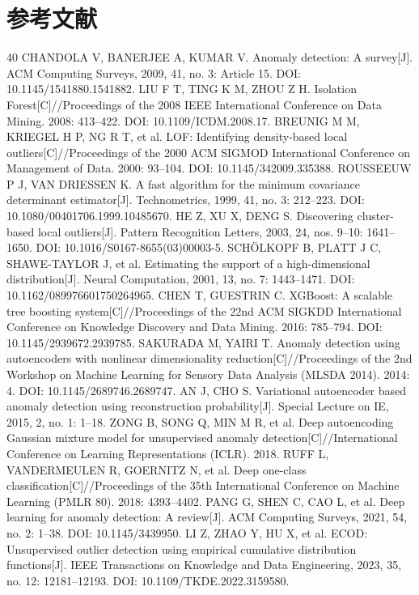 \documentclass[twocolumn,11pt]{ctexart}
\begin{document}
\section*{参考文献}
\begin{thebibliography}{40}
 CHANDOLA V, BANERJEE A, KUMAR V. Anomaly detection: A survey[J]. ACM Computing Surveys, 2009, 41, no. 3: Article 15. DOI: 10.1145/1541880.1541882.
 LIU F T, TING K M, ZHOU Z H. Isolation Forest[C]//Proceedings of the 2008 IEEE International Conference on Data Mining. 2008: 413–422. DOI: 10.1109/ICDM.2008.17.
 BREUNIG M M, KRIEGEL H P, NG R T, et al. LOF: Identifying density-based local outliers[C]//Proceedings of the 2000 ACM SIGMOD International Conference on Management of Data. 2000: 93–104. DOI: 10.1145/342009.335388.
 ROUSSEEUW P J, VAN DRIESSEN K. A fast algorithm for the minimum covariance determinant estimator[J]. Technometrics, 1999, 41, no. 3: 212–223. DOI: 10.1080/00401706.1999.10485670.
 HE Z, XU X, DENG S. Discovering cluster-based local outliers[J]. Pattern Recognition Letters, 2003, 24, nos. 9–10: 1641–1650. DOI: 10.1016/S0167-8655(03)00003-5.
 SCHÖLKOPF B, PLATT J C, SHAWE-TAYLOR J, et al. Estimating the support of a high-dimensional distribution[J]. Neural Computation, 2001, 13, no. 7: 1443–1471. DOI: 10.1162/089976601750264965.
 CHEN T, GUESTRIN C. XGBoost: A scalable tree boosting system[C]//Proceedings of the 22nd ACM SIGKDD International Conference on Knowledge Discovery and Data Mining. 2016: 785–794. DOI: 10.1145/2939672.2939785.
 SAKURADA M, YAIRI T. Anomaly detection using autoencoders with nonlinear dimensionality reduction[C]//Proceedings of the 2nd Workshop on Machine Learning for Sensory Data Analysis (MLSDA 2014). 2014: 4. DOI: 10.1145/2689746.2689747.
 AN J, CHO S. Variational autoencoder based anomaly detection using reconstruction probability[J]. Special Lecture on IE, 2015, 2, no. 1: 1–18.
 ZONG B, SONG Q, MIN M R, et al. Deep autoencoding Gaussian mixture model for unsupervised anomaly detection[C]//International Conference on Learning Representations (ICLR). 2018.
 RUFF L, VANDERMEULEN R, GOERNITZ N, et al. Deep one-class classification[C]//Proceedings of the 35th International Conference on Machine Learning (PMLR 80). 2018: 4393–4402.
 PANG G, SHEN C, CAO L, et al. Deep learning for anomaly detection: A review[J]. ACM Computing Surveys, 2021, 54, no. 2: 1–38. DOI: 10.1145/3439950.
 LI Z, ZHAO Y, HU X, et al. ECOD: Unsupervised outlier detection using empirical cumulative distribution functions[J]. IEEE Transactions on Knowledge and Data Engineering, 2023, 35, no. 12: 12181–12193. DOI: 10.1109/TKDE.2022.3159580.

\end{thebibliography}
\end{document}
